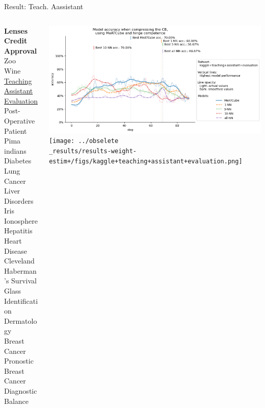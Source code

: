 \documentclass[]{beamer}
\begin{document}
\begin{frame}{Result: Teach. Aassistant}
    \begin{columns}
        \begin{column}{.3\textwidth}
            {\smaller\smaller\smaller
            \textbf{Lenses} \\
            \textbf{Credit Approval} \\
            Zoo \\
            Wine \\
            \underline{Teaching Assistant Evaluation} \\
            Post-Operative Patient \\
            Pima indians Diabetes \\
            Lung Cancer \\
            Liver Disorders \\
            Iris \\
            Ionosphere \\
            Hepatitis \\
            Heart Disease Cleveland \\
            Haberman's Survival \\
            Glass Identification \\
            Dermatology \\
            Breast Cancer Pronostic \\
            Breast Cancer Diagnostic \\
            Balance\\
            ~}
        \end{column}
        \begin{column}{.7\textwidth}
            \includegraphics[width=\textwidth]{../results-no-sim-tuning+/figs/kaggle+teaching+assistant+evaluation.png}
            \texttt{[image: ../obselete\\\_results/results-weight-estim+/figs/kaggle+teaching+assistant+evaluation.png]}
        \end{column}
    \end{columns}
\end{frame}
\end{document}

